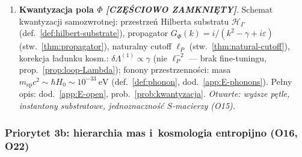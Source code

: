 \begin{enumerate}[label=\textbf{O\arabic*}., start=9, nosep]
  \item \textbf{Kwantyzacja pola $\Phi$
        \emph{[CZ\k{E}\'SCIOWO ZAMKNI\k{E}TY]}}.
        Schemat kwantyzacji samozwrotnej:
        przestrze\'n Hilberta substratu $\mathcal{H}_\Gamma$
        (def.~\ref{def:hilbert-substrate}),
        propagator $G_\Phi(k) = i/(k^2 - \gamma + i\varepsilon)$
        (stw.~\ref{thm:propagator}),
        naturalny cutoff $\ell_P$
        (stw.~\ref{thm:natural-cutoff}),
        korekcja \l{}adunku kosm.: $\delta\Lambda^{(1)} \propto \gamma$
        (nie $\ell_P^{-2}$ --- brak fine-tuningu,
        prop.~\ref{prop:loop-Lambda});
        fonony przestrzenno\'sci: masa
        $m_{\mathrm{sp}} c^2 \sim \hbar H_0 \sim 10^{-33}\ \mathrm{eV}$
        (def.~\ref{def:phonon}, dod.~\ref{app:E-phonons}).
        Pe\l{}ny opis: dod.~\ref{app:E-open}, prob.~\ref{prob:kwantyzacja}.
        \emph{Otwarte: wy\.zsze p\k{e}tle, instanto\-ny substratowe,
        jednoznaczno\'s\'c $S$-macierzy (O15).}
\end{enumerate}



\subsubsection{Priorytet 3b: hierarchia mas i~kosmologia entropijno (O16, O22)}

